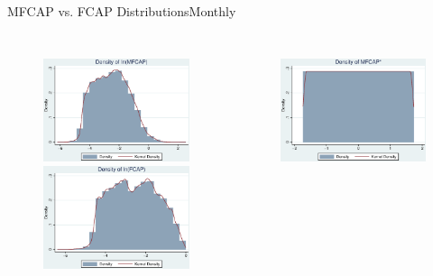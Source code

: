 \documentclass[handout]{beamer}
\begin{document}
\begin{frame}{MFCAP vs. FCAP Distributions}{Monthly}
\begin{columns}
\begin{figure}
						\includegraphics[width=\linewidth]{"Output/MHistlnFCA.eps"}\\
						\includegraphics[width=\linewidth]{"Output/MHistlnFCAP.eps"}
					\end{figure}
				\pause
					\begin{figure}   
						\centering
						\includegraphics[width=\linewidth]{"Output/MHistNFCA.eps"}  \\

\end{figure}
\end{columns}
\end{frame}
\end{document}
